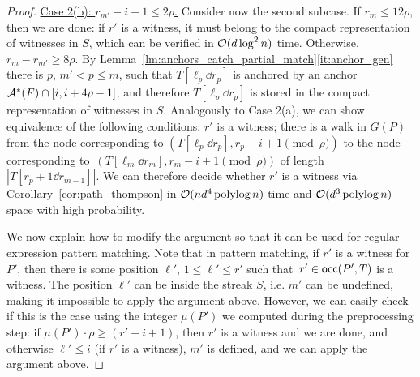\begin{proof}
\underline{Case 2(b): $r_{m'}-i+1 \le 2\rho$.} Consider now the second subcase. If $r_m \le 12 \rho$, then we are done: if $r'$ is a witness, it must belong to the compact representation of witnesses in $S$, which can be verified in $\mathcal{O}(d \log^2 n)$ time. Otherwise, $r_{m} - r_{m'} \ge 8\rho$.  By Lemma~\ref{lm:anchors_catch_partial_match}\ref{it:anchor_gen} there is $p$, $m' < p \le m$, such that $T[\ell_{p} \dd r_{p}]$ is anchored by an anchor $\mathcal{A}^\ast(F) \cap [i,i+4 \rho-1]$, and therefore $T[\ell_{p} \dd r_{p}]$ is stored in the compact representation of witnesses in $S$. Analogously to Case 2(a), we can show equivalence of the following conditions: $r'$ is a witness; there is a walk in $G(P)$ from the node corresponding to $(T[\ell_{p} \dd r_{p}], r_p-i+1 \pmod \rho)$ to the node corresponding to~$(T[\ell_{m} \dd r_{m}], r_m-i+1 \pmod \rho)$ of length $|T[r_{p}+1 \dd r_{m-1}]|$. We can therefore decide whether $r'$ is a witness via Corollary~\ref{cor:path_thompson} in $\mathcal{O}(nd^4 \operatorname{polylog} n)$ time and $\mathcal{O}(d^3\operatorname{polylog} n)$ space with high probability.

We now explain how to modify the argument so that it can be used for regular expression pattern matching. Note that in pattern matching, if $r'$ is a witness for $P'$, then there is some position $\ell'$, $1 \le \ell' \le r'$ such that~$r' \in \mathsf{occ}(P',T)$ is a witness. The position $\ell'$ can be inside the streak $S$, i.e. $m'$ can be undefined, making it impossible to apply the argument above. However, we can easily check if this is the case using the integer $\mu(P')$ we computed during the preprocessing step: if $\mu(P') \cdot \rho \ge (r'-i+1)$, then $r'$ is a witness and we are done, and otherwise $\ell' \le i$ (if $r'$ is a witness), $m'$ is defined, and we can apply the argument above.
\end{proof}

